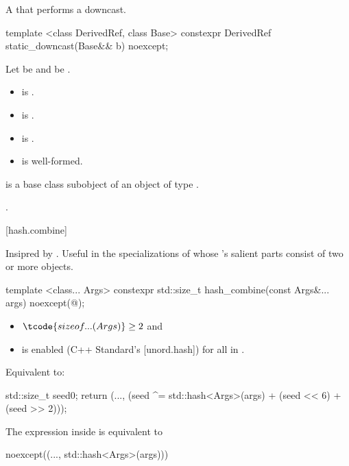 \pnum
A  that performs a downcast.

%
\begin{itemdecl}
template <class DerivedRef, class Base>
constexpr DerivedRef static_downcast(Base&& b) noexcept;
\end{itemdecl}

\begin{itemdescr}
\pnum
Let  be 
and  be .

\pnum
\constraints
\begin{itemize}
\item
   is .
\item
   is .
\item
   is .
\item
   is well-formed.
\end{itemize}

\pnum
\expects
{} is a base class subobject
of an object of type .

\pnum
\returns
{}.
\end{itemdescr}

[hash.combine]{}

\pnum
Insipred by .
Useful in the specializations of 
whose 's salient parts consist of two or more objects.

%
\begin{itemdecl}
template <class... Args>
constexpr std::size_t hash_combine(const Args&... args) noexcept(@\seebelow@);
\end{itemdecl}

\begin{itemdescr}
\pnum
\constraints
\begin{itemize}
\item
  $\tcode{sizeof...(Args)} \geq 2$ and
\item
   is enabled (C++ Standard's [unord.hash])
  for all  in .
\end{itemize}

\pnum
\effects
Equivalent to:
\begin{codeblock}
std::size_t seed{0};
return (..., (seed ^= std::hash<Args>{}(args) + (seed << 6) + (seed >> 2)));
\end{codeblock}

\pnum
\remarks
The expression inside  is equivalent to
\begin{codeblock}
noexcept((..., std::hash<Args>{}(args)))
\end{codeblock}
\end{itemdescr}
